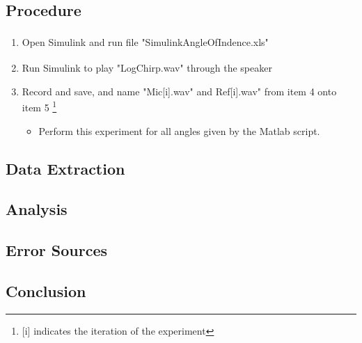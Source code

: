 \subsection{Procedure}
\begin{enumerate}
	\item Open Simulink\textsuperscript{\textregistered} and run file "SimulinkAngleOfIndence.xls"
	\item Run Simulink\textsuperscript{\textregistered} to play "LogChirp.wav" through the speaker
	\item Record and save, and name "Mic[i].wav" and Ref[i].wav" from item 4 onto item 5 \footnote{[i] indicates the iteration of the experiment}
	\begin{itemize}
		\item[] Perform this experiment for all angles given by the Matlab script. 
	\end{itemize}
\end{enumerate}

\subsection{Data Extraction}

\subsection{Analysis}

\subsection{Error Sources}

\subsection{Conclusion}